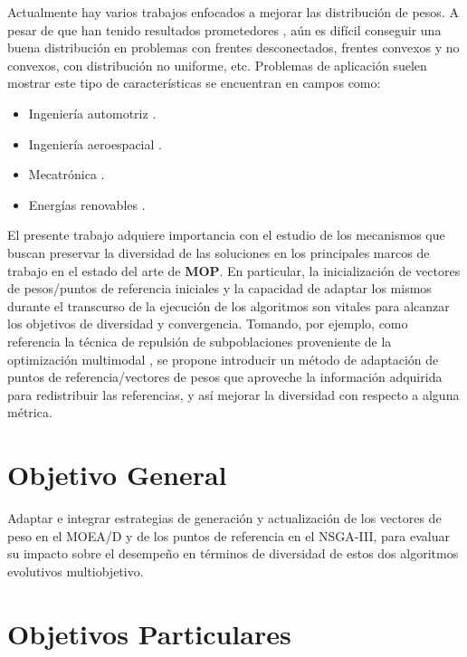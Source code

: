 \documentclass[letterpaper,10pt]{article}
\begin{document}
Actualmente hay varios trabajos enfocados a mejorar las distribución de pesos. A pesar de que han tenido resultados prometedores \cite{4358754,6600851,li2015evolutionary,fang2000uniform}, aún es difícil conseguir una buena distribución en problemas
con frentes desconectados, frentes convexos y no convexos, con distribución no uniforme, etc. Problemas de aplicación suelen mostrar este tipo de características se encuentran en campos como:

\begin{itemize}
 \item Ingeniería automotriz \cite{6600851,liao2008multiobjective}.
 \item Ingeniería aeroespacial \cite{keskin2006application}.
 \item Mecatrónica \cite{affi2007advanced}.
 \item Energías renovables \cite{you2012optimal}.
\end{itemize}
 
El presente trabajo adquiere importancia con el estudio de los mecanismos que buscan preservar la diversidad de las soluciones en los principales marcos de trabajo en el estado del arte de \textbf{MOP}. En particular,
la inicialización de vectores de pesos/puntos de referencia iniciales y la capacidad de adaptar los mismos durante el transcurso de la ejecución de los algoritmos son vitales para alcanzar los objetivos de diversidad y convergencia. 
Tomando, por ejemplo, como referencia la técnica de repulsión de subpoblaciones proveniente de la optimización multimodal \cite{ahrari2016multimodal}, se propone introducir un método de adaptación de puntos de referencia/vectores de pesos que aproveche la información adquirida para redistribuir las referencias, y así mejorar la diversidad con respecto a alguna métrica.

\section{Objetivo General}

Adaptar e integrar estrategias de generación y actualización de los vectores de peso en el MOEA/D y de los puntos de referencia en el NSGA-III, para  evaluar su impacto sobre el desempeño en términos de diversidad de estos dos algoritmos evolutivos multiobjetivo.

\section{Objetivos Particulares}
\end{document}
